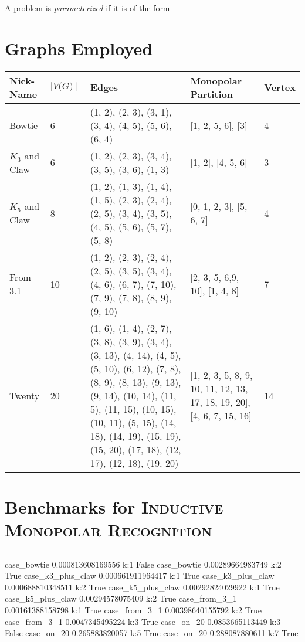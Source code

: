 \documentclass[11pt]{article}
\begin{document}
A problem is \textit{parameterized} if it is of the form \textit{}

\section{Graphs Employed}
\label{subsec:graphs}

\begin{center}
    \begin{tabu} to 0.8\textwidth { | X[l] X[c] X[c] X[c] X[c] | }
        \hline
        Nick-Name & $\mid\textit{V(G)}\mid$ & Edges & Monopolar Partition & Vertex \\
        [0.5ex]
        \hline
        \hline
        Bowtie & 6 & (1, 2), (2, 3), (3, 1), (3, 4), (4, 5), (5, 6), (6, 4) & [1, 2, 5, 6], [3] & 4 \\
        [0.3ex]
        \hline
        $K_3$ and Claw & 6 & (1, 2), (2, 3), (3, 4), (3, 5), (3, 6), (1, 3) & [1, 2], [4, 5, 6] & 3 \\
        [0.3ex]
        \hline
        $K_5$ and Claw & 8 & (1, 2), (1, 3), (1, 4), (1, 5), (2, 3), (2, 4), (2, 5), (3, 4), (3, 5), (4, 5), (5, 6), (5, 7), (5, 8) & [0, 1, 2, 3], [5, 6, 7] & 4 \\
        [0.3ex]
        \hline
        From 3.1 & 10 & (1, 2), (2, 3), (2, 4), (2, 5), (3, 5), (3, 4), (4, 6), (6, 7), (7, 10), (7, 9), (7, 8), (8, 9), (9, 10) & [2, 3, 5, 6,9, 10], [1, 4, 8] & 7 \\
        [0.3ex]
        \hline
        Twenty & 20 & (1, 6), (1, 4), (2, 7), (3, 8), (3, 9), (3, 4), (3, 13), (4, 14), (4, 5), (5, 10), (6, 12), (7, 8), (8, 9), (8, 13), (9, 13), (9, 14), (10, 14), (11, 5), (11, 15), (10, 15), (10, 11), (5, 15), (14, 18), (14, 19), (15, 19), (15, 20), (17, 18), (12, 17), (12, 18), (19, 20) & [1, 2, 3, 5, 8, 9, 10, 11, 12, 13, 17, 18, 19, 20], [4, 6, 7, 15, 16] & 14 \\
        [0.3ex]
        \hline
    \end{tabu}
\end{center}

\section{Benchmarks for \textsc{Inductive Monopolar Recognition}}
\label{subsec:structural}

\subsection{}
\label{subsec:results} %
case_bowtie 0.000813608169556 k:1 False
case_bowtie 0.00289664983749 k:2 True
case_k3_plus_claw 0.000661911964417 k:1 True
case_k3_plus_claw 0.000688810348511 k:2 True
case_k5_plus_claw 0.00292824029922 k:1 True
case_k5_plus_claw 0.00294578075409 k:2 True
case_from_3_1 0.00161388158798 k:1 True
case_from_3_1 0.00398640155792 k:2 True
case_from_3_1 0.0047345495224 k:3 True
case_on_20 0.0853665113449 k:3 False
case_on_20 0.265883820057 k:5 True
case_on_20 0.288087880611 k:7 True
\end{document}
